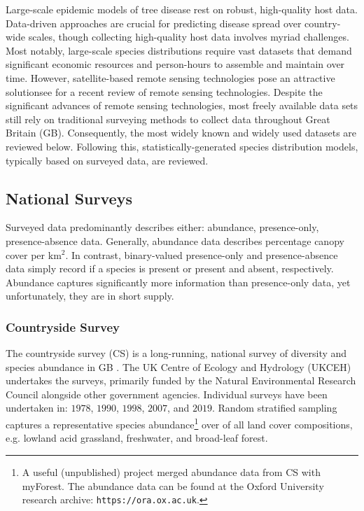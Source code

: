Large-scale epidemic models of tree disease rest on robust, high-quality host data.
Data-driven approaches are crucial for predicting disease spread over country-wide scales, 
though collecting high-quality host data involves myriad challenges. 
Most notably, large-scale species distributions require vast datasets that demand significant economic resources
and person-hours to assemble and maintain over time. 
However, satellite-based remote sensing technologies pose an attractive solution\textemdash see \cite{camarretta2020monitoring} for a recent review of remote sensing technologies.
Despite the significant advances of remote sensing technologies, most freely available data sets still rely on traditional surveying methods to collect data throughout Great Britain (GB).
Consequently, the most widely known and widely used datasets are reviewed below.
Following this, statistically-generated species distribution models, typically based on surveyed data, are reviewed.

\subsection{National Surveys}

Surveyed data predominantly describes either: abundance, presence-only, presence-absence data. 
Generally, abundance data describes percentage canopy cover per $\mathrm{km^2}$.
In contrast, binary-valued presence-only and presence-absence data simply record if a species is present or present and absent, respectively.
Abundance captures significantly more information than presence-only data, yet unfortunately, they are in short supply.

\subsubsection{Countryside Survey}

The countryside survey (CS) is a long-running, national survey of diversity and species abundance in GB \cite{wood2017long}.
The UK Centre of Ecology and Hydrology (UKCEH) undertakes the surveys, primarily funded by the Natural Environmental Research Council alongside other government agencies.
Individual surveys have been undertaken in: $1978$, $1990$, $1998$, $2007$, and $2019$. 
Random stratified sampling captures a representative species abundance\footnote{
A useful (unpublished) project merged abundance data from CS with myForest. The abundance data can be found at the Oxford University research archive: \nolinkurl{https://ora.ox.ac.uk}.} 
over of all land cover compositions, e.g. lowland acid grassland, freshwater, and broad-leaf forest.

